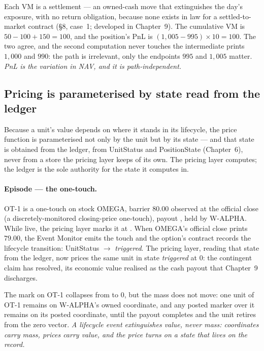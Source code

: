 Each VM is a settlement --- an owned-cash move that extinguishes the day's
exposure, with no return obligation, because none exists in law for a
settled-to-market contract (§8, case~1; developed in Chapter~9). The
cumulative VM is $50 - 100 + 150 = 100$, and the position's PnL is
$(1{,}005 - 995)\times 10 = 100$. The two agree, and the second computation
never touches the intermediate prints $1{,}000$ and $990$: the path is
irrelevant, only the endpoints $995$ and $1{,}005$ matter.
\emph{PnL is the variation in NAV, and it is path-independent.}

\subsection{Pricing is parameterised by state read from the ledger}

Because a unit's value depends on where it stands in its lifecycle, the price
function is parameterised not only by the unit but by its state --- and that
state is obtained from the ledger, from UnitStatus and PositionState
(Chapter~6), never from a store the pricing layer keeps of its own. The pricing
layer computes; the ledger is the sole authority for the state it computes in.

\paragraph{Episode --- the one-touch.}
OT-1 is a one-touch on stock OMEGA, barrier $80.00$ observed at the official
close (a discretely-monitored closing-price one-touch), payout
, held by W-ALPHA. While live, the pricing layer marks it at
. When OMEGA's official close prints $79.00$, the Event Monitor
emits the touch and the option's contract records the lifecycle transition:
UnitStatus $\rightarrow$ \emph{triggered}. The pricing layer, reading that
state from the ledger, now prices the same unit in state \emph{triggered} at
$0$: the contingent claim has resolved, its economic value realised as the
cash payout that Chapter~9 discharges.

The mark on OT-1 collapses from  to $0$, but the mass does not
move: one unit of OT-1 remains on W-ALPHA's owned coordinate, and any posted
marker over it remains on its posted coordinate, until the payout completes and
the unit retires from the zero vector. \emph{A lifecycle event extinguishes
value, never mass: coordinates carry mass, prices carry value, and the price
turns on a state that lives on the record.}

